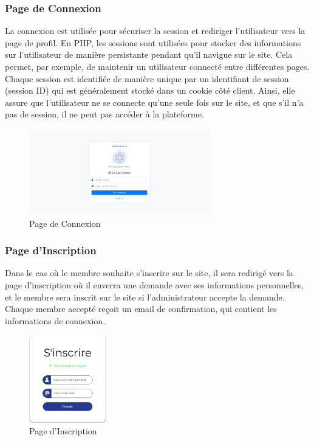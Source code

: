 \documentclass{article}
\begin{document}
                \subsubsection{Page de Connexion}
                    La connexion est utilisée pour sécuriser la session et rediriger l'utilisateur vers la page de profil. En PHP, les sessions sont utilisées pour stocker des informations sur l'utilisateur de manière persistante pendant qu'il navigue sur le site. Cela permet, par exemple, de maintenir un utilisateur connecté entre différentes pages. Chaque session est identifiée de manière unique par un identifiant de session (session ID) qui est généralement stocké dans un cookie côté client.
                    Ainsi, elle assure que l'utilisateur ne se connecte qu'une seule fois sur le site, et que s'il n'a pas de session, il ne peut pas accéder à la plateforme.
                    \begin{figure}[h!]
                        \centering
                        \includegraphics[width=0.7\textwidth]{assets/webSite/loginCollab.jpeg}
                        \caption{Page de Connexion}
                    \end{figure}
                    \FloatBarrier
                \subsubsection{Page d'Inscription}
                    Dans le cas où le membre souhaite s'inscrire sur le site, il sera redirigé vers la page d'inscription où il enverra une demande avec ses informations personnelles, et le membre sera inscrit sur le site si l'administrateur accepte la demande.
                    Chaque membre accepté reçoit un email de confirmation, qui contient les informations de connexion.
                    \begin{figure}[h!]
                        \centering
                        \includegraphics[width=0.3\textwidth]{assets/webSite/envoieDemande.jpeg}
                        \caption{Page d'Inscription}
                    \end{figure}
                    \FloatBarrier
\end{document}
